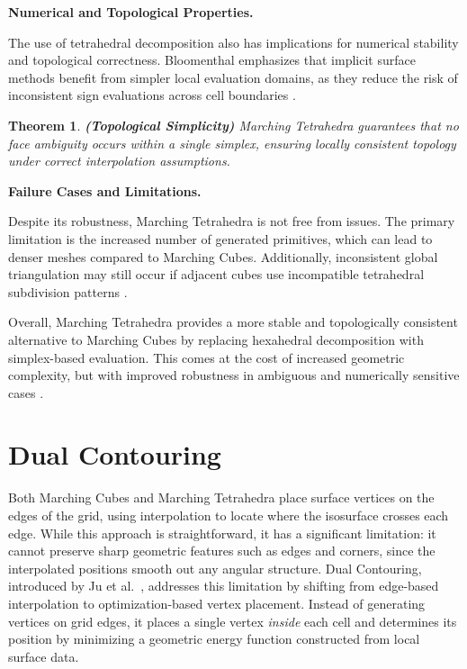 \documentclass[12pt, a4paper, oneside]{book}
\theoremstyle{plain}
\newtheorem{theorem}{Theorem}[chapter]
\theoremstyle{definition}
\theoremstyle{remark}
\theoremstyle{definition}
\begin{document}
\vspace{0.5em}

\textbf{Numerical and Topological Properties.}

The use of tetrahedral decomposition also has implications for numerical stability and
topological correctness. Bloomenthal emphasizes that implicit surface methods benefit
from simpler local evaluation domains, as they reduce the risk of inconsistent sign
evaluations across cell boundaries \cite{bloomenthal1997introduction}.

\begin{theorem}
    \textbf{(Topological Simplicity)}
Marching Tetrahedra guarantees that no face ambiguity occurs within a single simplex,
ensuring locally consistent topology under correct interpolation assumptions.
\end{theorem}

\vspace{0.5em}

\textbf{Failure Cases and Limitations.}

Despite its robustness, Marching Tetrahedra is not free from issues. The primary
limitation is the increased number of generated primitives, which can lead to denser
meshes compared to Marching Cubes. Additionally, inconsistent global triangulation may
still occur if adjacent cubes use incompatible tetrahedral subdivision patterns
\cite{nielson2008dual}.

\vspace{0.5em}

Overall, Marching Tetrahedra provides a more stable and topologically consistent
alternative to Marching Cubes by replacing hexahedral decomposition with simplex-based
evaluation. This comes at the cost of increased geometric complexity, but with improved
robustness in ambiguous and numerically sensitive cases
\cite{shirley1990marching,treece1999regularised,nielson2008dual}.


\section{Dual Contouring}

Both Marching Cubes and Marching Tetrahedra place surface vertices on the edges of the
grid, using interpolation to locate where the isosurface crosses each edge. While this
approach is straightforward, it has a significant limitation: it cannot preserve sharp
geometric features such as edges and corners, since the interpolated positions smooth out
any angular structure. Dual Contouring, introduced by Ju et al.\ \cite{ju2002dual},
addresses this limitation by shifting from edge-based interpolation to
optimization-based vertex placement. Instead of generating vertices on grid edges, it
places a single vertex \emph{inside} each cell and determines its position by minimizing
a geometric energy function constructed from local surface data.
\end{document}
